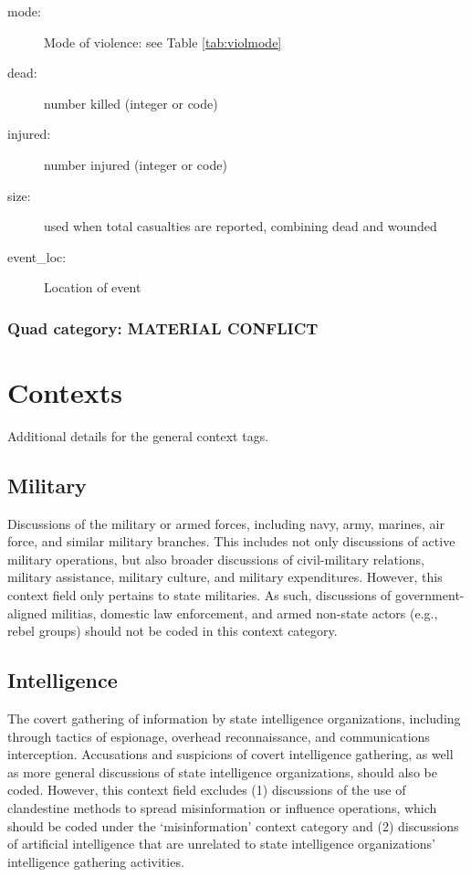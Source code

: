 \documentclass[11pt]{report}
\begin{document}
\begin{description}
	\item[mode:] Mode of violence: see Table \ref{tab:violmode}
	\item[dead:]  number killed (integer or code)
	\item[injured:] number injured (integer or code)
	\item[size:] used when total casualties are reported, combining dead and wounded
	\item[event\_loc:] Location of event
\end{description}


\subsection{Quad category: MATERIAL CONFLICT}


\chapter{Contexts}\label{chapter:contexts}

Additional details for the general context tags.

\section{Military}\label{context:military}

Discussions of the military or armed forces, including navy, army, marines, air force, and similar military branches. This includes not only discussions of active military operations, but also broader discussions of civil-military relations, military assistance, military culture, and military expenditures. However, this context field only pertains to state militaries. As such, discussions of government-aligned militias, domestic law enforcement, and armed non-state actors (e.g., rebel groups) should not be coded in this context category.


\section{Intelligence}\label{context:intelligence}

The covert gathering of information by state intelligence organizations, including through tactics of espionage, overhead reconnaissance, and communications interception. Accusations and suspicions of covert intelligence gathering, as well as more general discussions of state intelligence organizations, should also be coded. However, this context field excludes (1) discussions of the use of clandestine methods to spread misinformation or influence operations, which should be coded under the `misinformation' context category and (2) discussions of artificial intelligence that are unrelated to state intelligence organizations' intelligence gathering activities.
\end{document}
